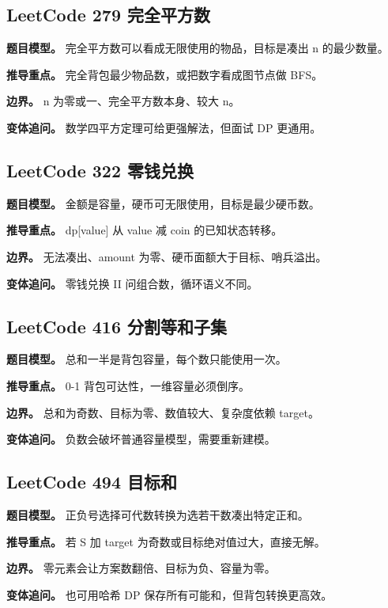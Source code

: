 \subsection{LeetCode 279 完全平方数}

\textbf{题目模型。} 完全平方数可以看成无限使用的物品，目标是凑出 n 的最少数量。

\textbf{推导重点。} 完全背包最少物品数，或把数字看成图节点做 BFS。

\textbf{边界。} n 为零或一、完全平方数本身、较大 n。

\textbf{变体追问。} 数学四平方定理可给更强解法，但面试 DP 更通用。

\subsection{LeetCode 322 零钱兑换}

\textbf{题目模型。} 金额是容量，硬币可无限使用，目标是最少硬币数。

\textbf{推导重点。} dp[value] 从 value 减 coin 的已知状态转移。

\textbf{边界。} 无法凑出、amount 为零、硬币面额大于目标、哨兵溢出。

\textbf{变体追问。} 零钱兑换 II 问组合数，循环语义不同。

\subsection{LeetCode 416 分割等和子集}

\textbf{题目模型。} 总和一半是背包容量，每个数只能使用一次。

\textbf{推导重点。} 0-1 背包可达性，一维容量必须倒序。

\textbf{边界。} 总和为奇数、目标为零、数值较大、复杂度依赖 target。

\textbf{变体追问。} 负数会破坏普通容量模型，需要重新建模。

\subsection{LeetCode 494 目标和}

\textbf{题目模型。} 正负号选择可代数转换为选若干数凑出特定正和。

\textbf{推导重点。} 若 S 加 target 为奇数或目标绝对值过大，直接无解。

\textbf{边界。} 零元素会让方案数翻倍、目标为负、容量为零。

\textbf{变体追问。} 也可用哈希 DP 保存所有可能和，但背包转换更高效。

